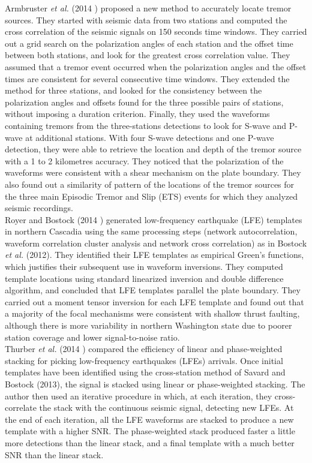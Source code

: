 \documentclass[main.tex]{subfiles}
\begin{document}
Armbruster \textit{et al.} (2014 \cite{ARM_2014}) proposed a new method to accurately locate tremor sources. They started with seismic data from two stations and computed the cross correlation of the seismic signals on 150 seconds time windows. They carried out a grid search on the polarization angles of each station and the offset time between both stations, and look for the greatest cross correlation value. They assumed that a tremor event occurred when the polarization angles and the offset times are consistent for several consecutive time windows. They extended the method for three stations, and looked for the consistency between the polarization angles and offsets found for the three possible pairs of stations, without imposing a duration criterion. Finally, they used the waveforms containing tremors from the three-stations detections to look for S-wave and P-wave at additional stations. With four S-wave detections and one P-wave detection, they were able to retrieve the location and depth of the tremor source with a 1 to 2 kilometres accuracy. They noticed that the polarization of the waveforms were consistent with a shear mechanism on the plate boundary. They also found out a similarity of pattern of the locations of the tremor sources for the three main Episodic Tremor and Slip (ETS) events for which they analyzed seismic recordings. \\

Royer and Bostock (2014 \cite{ROY_2014}) generated low-frequency earthquake (LFE) templates in northern Cascadia using the same processing steps (network autocorrelation, waveform correlation cluster analysis and network cross correlation) as in Bostock \textit{et al.} (2012). They identified their LFE templates as empirical Green's functions, which justifies their subsequent use in waveform inversions. They computed template locations using standard linearized inversion and double difference algorithm, and concluded that LFE templates parallel the plate boundary. They carried out a moment tensor inversion for each LFE template and found out that a majority of the focal mechanisms were consistent with shallow thrust faulting, although there is more variability in northern Washington state due to poorer station coverage and lower signal-to-noise ratio. \\

Thurber \textit{et al.} (2014 \cite{THU_2014}) compared the efficiency of linear and phase-weighted stacking for picking low-frequency earthquakes (LFEs) arrivals. Once initial templates have been identified using the cross-station method of Savard and Bostock (2013), the signal is stacked using linear or phase-weighted stacking. The author then used an iterative procedure in which, at each iteration, they cross-correlate the stack with the continuous seismic signal, detecting new LFEs. At the end of each iteration, all the LFE waveforms are stacked to produce a new template with a higher SNR. The phase-weighted stack produced faster a little more detections than the linear stack, and a final template with a much better SNR than the linear stack. \\
\end{document}
